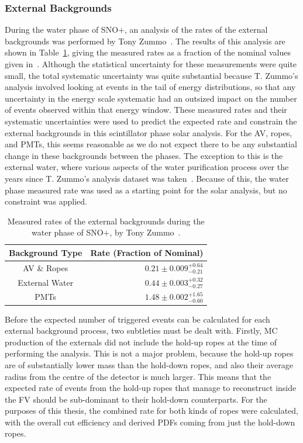 \subsubsection{External Backgrounds}
During the water phase of SNO+, an analysis of the rates of the external backgrounds was performed by Tony Zummo~\cite{}. %
The results of this analysis are shown in Table~\ref{tab:externals_rates_zummo}, giving the measured rates as a fraction of the nominal values given in~\cite{}. %
Although the statistical uncertainty for these measurements were quite small, the total systematic uncertainty was quite substantial because T. Zummo's analysis involved looking at events in the tail of energy distributions, so that any uncertainty in the energy scale systematic had an outsized impact on the number of events observed within that energy window. These measured rates and their systematic uncertainties were used to predict the expected rate and constrain the external backgrounds in this scintillator phase solar analysis. For the AV, ropes, and PMTs, this seems reasonable as we do not expect there to be any substantial change in these backgrounds between the phases. The exception to this is the external water, where various aspects of the water purification process over the years since T. Zummo's analysis dataset was taken~\cite{}. Because of this, the water phase measured rate was used as a starting point for the solar analysis, but no constraint was applied.

\begin{table}
    \centering
    \begin{tabular}{c r}
        \hline
        Background Type & Rate (Fraction of Nominal)  \\ \hline \hline
        AV \& Ropes    & $0.21\pm0.009^{+0.64}_{-0.21}$  \\
        External Water & $0.44\pm0.003^{+0.32}_{-0.27}$  \\
        PMTs           & $1.48\pm0.002^{+1.65}_{-0.60}$  \\
        \hline
    \end{tabular}
    \caption{Measured rates of the external backgrounds during the water phase of SNO+, by Tony Zummo~\cite{}. %
    }
    \label{tab:externals_rates_zummo}
\end{table}

Before the expected number of triggered events can be calculated for each external background process, two subtleties must be dealt with. Firstly, MC production of the externals did not include the hold-up ropes at the time of performing the analysis. This is not a major problem, because the hold-up ropes are of substantially lower mass than the hold-down ropes, and also their average radius from the centre of the detector is much larger. This means that the expected rate of events from the hold-up ropes that manage to reconstruct inside the FV should be sub-dominant to their hold-down counterparts. For the purposes of this thesis, the combined rate for both kinds of ropes were calculated, with the overall cut efficiency and derived PDFs coming from just the hold-down ropes.

